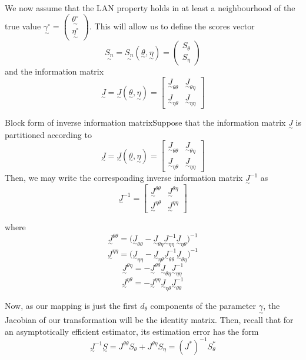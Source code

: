 \documentclass[twoside]{article}
\newcommand{\utilde}{\underset{\sim}}
\begin{document}
We now assume that the LAN property holds in at least a neighbourhood of the true value $\utilde{\gamma^{\circ}} = \begin{pmatrix}\utilde{\theta^{\circ}}\\\utilde{\eta^{\circ}} \end{pmatrix}$. This will allow us to define the scores vector 
$$
\utilde{S_n} = \utilde{S_n}(\utilde{\theta}, \utilde{\eta}) = \begin{pmatrix}S_{\theta}\\S_{\eta} \end{pmatrix}
$$
and the information matrix 
$$
\utilde{J} = \utilde{J}(\utilde{\theta}, \utilde{\eta}) = 
\begin{bmatrix}
\utilde{J}_{\theta \theta} & \utilde{J}_{\theta \eta}\\
\utilde{J}_{\eta \theta} & \utilde{J}_{\eta \eta}
\end{bmatrix}
$$

\begin{proposition_exam}{Block form of inverse information matrix}{}Suppose that the information matrix $\utilde{J}$ is partitioned according to 
$$
\utilde{J} = \utilde{J}(\utilde{\theta}, \utilde{\eta}) = 
\begin{bmatrix}
\utilde{J}_{\theta \theta} & \utilde{J}_{\theta \eta}\\
\utilde{J}_{\eta \theta} & \utilde{J}_{\eta \eta}
\end{bmatrix}
$$
Then, we may write the corresponding inverse information matrix $\utilde{J}^{-1}$ as 
$$
\utilde{J}^{-1} = 
\begin{bmatrix}
\utilde{J}^{\theta \theta} & \utilde{J}^{\theta \eta}\\
\utilde{J}^{\eta \theta} & \utilde{J}^{\eta \eta}
\end{bmatrix}
$$

where 
$$
\utilde{J}^{\theta \theta} = \bigg(\utilde{J}_{\theta \theta} - \utilde{J}_{\theta \eta}\utilde{J}_{\eta \eta}^{-1}\utilde{J}_{\eta \theta} \bigg)^{-1}
$$
$$
\utilde{J}^{\eta \eta} = \bigg(\utilde{J}_{\eta \eta} - \utilde{J}_{\eta \theta}\utilde{J}_{\theta \theta}^{-1}\utilde{J}_{\theta \eta} \bigg)^{-1}
$$
$$
\utilde{J}^{\theta \eta} =  -\utilde{J}^{\theta \theta}\utilde{J}_{\theta \eta}\utilde{J}_{\eta \eta}^{-1}
$$
$$
\utilde{J}^{\eta \theta} =  -\utilde{J}^{\eta \eta}\utilde{J}_{\eta \theta}\utilde{J}_{\theta \theta}^{-1}
$$

\end{proposition_exam}

Now, as our mapping is just the first $d_{\theta}$ components of the parameter $\utilde{\gamma}$, the Jacobian of our transformation will be the identity matrix. Then, recall that for an asymptotically efficient estimator, its estimation error has the form 
$$
\utilde{J}^{-1}\utilde{S} = J^{\theta \theta}S_{\theta} + J^{\theta \eta}S_{\eta} = (J^*)^{-1}S_{\theta}^{*}
$$
\end{document}
